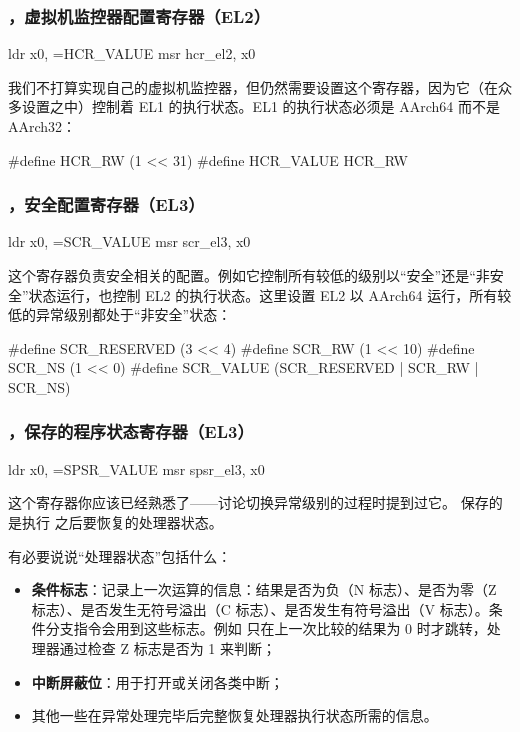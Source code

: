 \subsubsection{，虚拟机监控器配置寄存器（EL2）}

\begin{asmcode}
	ldr	x0, =HCR_VALUE
	msr	hcr_el2, x0
\end{asmcode}

我们不打算实现自己的虚拟机监控器，但仍然需要设置这个寄存器，因为它（在众多设置之中）控制着 EL1 的执行状态。EL1 的执行状态必须是 AArch64 而不是 AArch32：

\begin{ccode}
#define HCR_RW      (1 << 31)
#define HCR_VALUE   HCR_RW
\end{ccode}

\subsubsection{，安全配置寄存器（EL3）}

\begin{asmcode}
	ldr	x0, =SCR_VALUE
	msr	scr_el3, x0
\end{asmcode}

这个寄存器负责安全相关的配置。例如它控制所有较低的级别以“安全”还是“非安全”状态运行，也控制 EL2 的执行状态。这里设置 EL2 以 AArch64 运行，所有较低的异常级别都处于“非安全”状态：

\begin{ccode}
#define SCR_RESERVED    (3 << 4)
#define SCR_RW          (1 << 10)
#define SCR_NS          (1 << 0)
#define SCR_VALUE       (SCR_RESERVED | SCR_RW | SCR_NS)
\end{ccode}

\subsubsection{，保存的程序状态寄存器（EL3）}

\begin{asmcode}
	ldr	x0, =SPSR_VALUE
	msr	spsr_el3, x0
\end{asmcode}

这个寄存器你应该已经熟悉了——讨论切换异常级别的过程时提到过它。 保存的是执行  之后要恢复的处理器状态。

有必要说说“处理器状态”包括什么：

\begin{itemize}
  \item \textbf{条件标志}：记录上一次运算的信息：结果是否为负（N 标志）、是否为零（Z 标志）、是否发生无符号溢出（C 标志）、是否发生有符号溢出（V 标志）。条件分支指令会用到这些标志。例如  只在上一次比较的结果为 0 时才跳转，处理器通过检查 Z 标志是否为 1 来判断；
  \item \textbf{中断屏蔽位}：用于打开或关闭各类中断；
  \item 其他一些在异常处理完毕后完整恢复处理器执行状态所需的信息。
\end{itemize}


